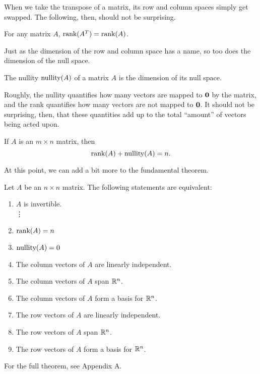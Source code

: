 \documentclass[../m73main.tex]{subfiles}
\begin{document}
When we take the transpose of a matrix, its row and column spaces simply get swapped.
The following, then, should not be surprising.

\begin{theorem}
	For any matrix $A$, $\textrm{rank}(A^T) = \textrm{rank}(A)$.
\end{theorem}

Just as the dimension of the row and column space has a name, so too does the dimension of the null space.

\begin{definition}[Nullity]
	The nullity $\textrm{nullity}(A)$ of a matrix $A$ is the dimension of its null space.
\end{definition}

Roughly, the nullity quantifies how many vectors are mapped to $\mathbf{0}$ by the matrix, and the rank quantifies how many vectors are not mapped to $\mathbf{0}$.
It should not be surprising, then, that these quantities add up to the total ``amount'' of vectors being acted upon.

\begin{theorem}
	If $A$ is an $m\times n$ matrix, then
	\[ \textrm{rank}(A) + \textrm{nullity}(A) = n. \]
\end{theorem}

At this point, we can add a bit more to the fundamental theorem.

\begin{theorem}
	Let $A$ be an $n\times n$ matrix.
	The following statements are equivalent:
	\begin{enumerate}[label=(\alph*)]
		\item $A$ is invertible. \\
		\phantom{~}\hspace{-19.5pt} \vdots
		\setcounter{enumi}{5}		
		\item $\textrm{rank}(A) = n$
		\item $\textrm{nullity}(A) = 0$
		\item The column vectors of $A$ are linearly independent.
		\item The column vectors of $A$ span $\mathbb{R}^n$.
		\item The column vectors of $A$ form a basis for $\mathbb{R}^n$.
		\item The row vectors of $A$ are linearly independent.
		\item The row vectors of $A$ span $\mathbb{R}^n$.
		\item The row vectors of $A$ form a basis for $\mathbb{R}^n$.
	\end{enumerate}
	For the full theorem, see Appendix A.
\end{theorem}
\end{document}
